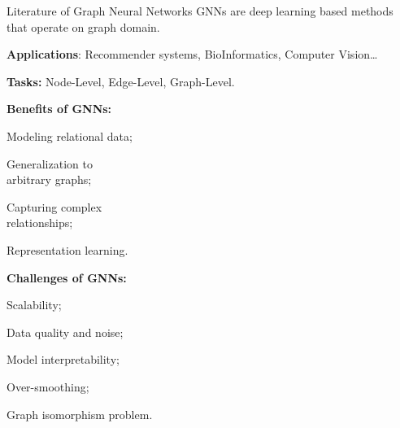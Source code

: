 \begin{tframe}{Literature of Graph Neural Networks}
    GNNs are deep learning based methods that operate on graph domain.
    \vspace{0.2cm}

    \textbf{Applications}: Recommender systems, BioInformatics, Computer Vision\ldots
    \vspace{0.2cm}

    \textbf{Tasks:} Node-Level, Edge-Level, Graph-Level.
    \vspace{0.2cm}

    \begin{minipage}[t]{.5\linewidth}
        \textbf{Benefits of GNNs:}
        \begin{adv}
            \item Modeling relational data;
            \item Generalization to\\ arbitrary graphs;
            \item Capturing complex\\ relationships;
            \item Representation learning.
        \end{adv}
    \end{minipage}%
    \hfill%
    \begin{minipage}[t]{.5\linewidth}
        \textbf{Challenges of GNNs:}
        \begin{disadv}
            \item Scalability;
            \item Data quality and noise;
            \item Model interpretability;
            \item Over-smoothing;
            \item Graph isomorphism problem.
        \end{disadv}
    \end{minipage}
\end{tframe}
%
